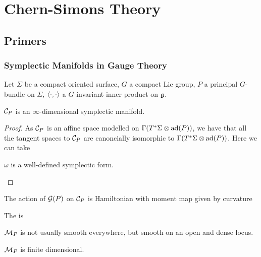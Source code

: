 \documentclass{article}
\begin{document}
\section{Chern-Simons Theory}
\subsection{Primers}
\subsubsection{Symplectic Manifolds in Gauge Theory}
Let $\Sigma$ be a compact oriented surface, $G$ a compact Lie group, $P$ a principal $G$-bundle on $\Sigma$, $\left\langle \cdot,\cdot \right\rangle$ a $G$-invariant inner product on $\mathfrak{g}$.

\begin{prop}
	$\mathcal{C}_P$ is an $\infty$-dimensional symplectic manifold. 
\end{prop}
\begin{proof}
	As $\mathcal{C}_P$ is an affine space modelled on $\Gamma(T^\ast \Sigma \otimes \operatorname{ad}(P))$, we have that all the tangent spaces to $\mathcal{C}_P$ are canoncially isomorphic to $\Gamma(T^\ast \Sigma \otimes \operatorname{ad}(P))$. Here we can take 
\begin{claim}
	$\omega$ is a well-defined symplectic form. 
\end{claim}
\end{proof}

\begin{theorem}
	The action of $\mathcal{G}(P)$ on $\mathcal{C}_P$ is Hamiltonian with moment map given by curvature 
\end{theorem}

\begin{definition}
	The  is 
\end{definition}

\begin{remark}
	$\mathcal{M}_P$ is not usually smooth everywhere, but smooth on an open and dense locus.
\end{remark}

\begin{prop}
	$\mathcal{M}_P$ is finite dimensional. 
\end{prop}
\end{document}
